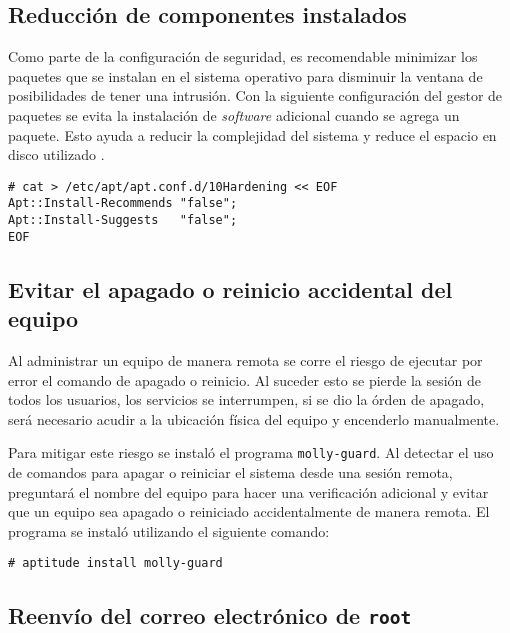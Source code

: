       \subsection {Reducci\'{o}n de componentes instalados}

Como parte de la configuraci\'{o}n de seguridad, es recomendable minimizar los paquetes que se instalan en el sistema operativo para disminuir la ventana de posibilidades de tener una intrusi\'{o}n. Con la siguiente configuraci\'{o}n del gestor de paquetes se evita la instalaci\'{o}n de \emph{\gls{software}} adicional cuando se agrega un paquete. Esto ayuda a reducir la complejidad del sistema y reduce el espacio en disco utilizado \cite{_configuration_????}.

{
\scriptsize
\linespread{1}
\begin{verbatim}
# cat > /etc/apt/apt.conf.d/10Hardening << EOF
Apt::Install-Recommends "false";
Apt::Install-Suggests   "false";
EOF
\end{verbatim}
}

      \subsection {Evitar el apagado o reinicio accidental del equipo}

Al administrar un equipo de manera remota se corre el riesgo de ejecutar por error el comando de apagado o reinicio. Al suceder esto se pierde la sesi\'{o}n de todos los usuarios, los servicios se interrumpen, si se dio la \'{o}rden de apagado, ser\'{a} necesario acudir a la ubicaci\'{o}n f\'{i}sica del equipo y encenderlo manualmente.

Para mitigar este riesgo se instal\'{o} el programa \texttt{molly-guard}. Al detectar el uso de comandos para apagar o reiniciar el sistema desde una sesi\'{o}n remota, preguntar\'{a} el nombre del equipo para hacer una verificaci\'{o}n adicional y evitar que un equipo sea apagado o reiniciado accidentalmente de manera remota. El programa se instal\'{o} utilizando el siguiente comando:

{
\scriptsize
\linespread{1}
\begin{verbatim}
# aptitude install molly-guard
\end{verbatim}
}

      \subsection {Reenv\'{i}o del correo electr\'{o}nico de \texttt{root}}

